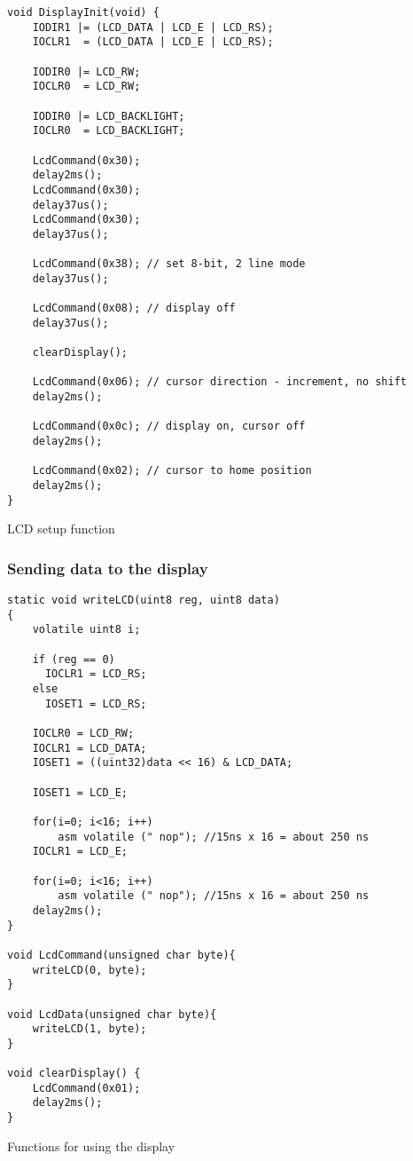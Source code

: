 \documentclass[10pt]{article}
\begin{document}
\begin{program}[h]
	\begin{lstlisting}
void DisplayInit(void) {
	IODIR1 |= (LCD_DATA | LCD_E | LCD_RS);
	IOCLR1  = (LCD_DATA | LCD_E | LCD_RS);

	IODIR0 |= LCD_RW;
	IOCLR0  = LCD_RW;
	
    IODIR0 |= LCD_BACKLIGHT;
    IOCLR0  = LCD_BACKLIGHT;

    LcdCommand(0x30);
    delay2ms();
    LcdCommand(0x30);
    delay37us();
    LcdCommand(0x30);
    delay37us();

    LcdCommand(0x38); // set 8-bit, 2 line mode
    delay37us();

    LcdCommand(0x08); // display off
    delay37us();

    clearDisplay();

    LcdCommand(0x06); // cursor direction - increment, no shift
    delay2ms();

    LcdCommand(0x0c); // display on, cursor off
    delay2ms();

    LcdCommand(0x02); // cursor to home position
    delay2ms();
}
	\end{lstlisting}
	\caption{LCD setup function}
\end{program}

\subsubsection{Sending data to the display}

\begin{program}[h]
	\begin{lstlisting}
static void writeLCD(uint8 reg, uint8 data)
{
	volatile uint8 i;

	if (reg == 0)
	  IOCLR1 = LCD_RS;
	else
	  IOSET1 = LCD_RS;

    IOCLR0 = LCD_RW;
	IOCLR1 = LCD_DATA;
	IOSET1 = ((uint32)data << 16) & LCD_DATA;
	
	IOSET1 = LCD_E;

	for(i=0; i<16; i++)
        asm volatile (" nop"); //15ns x 16 = about 250 ns
	IOCLR1 = LCD_E;

	for(i=0; i<16; i++)
        asm volatile (" nop"); //15ns x 16 = about 250 ns
    delay2ms();
}

void LcdCommand(unsigned char byte){
    writeLCD(0, byte);
}

void LcdData(unsigned char byte){
    writeLCD(1, byte);
}

void clearDisplay() {
    LcdCommand(0x01); 
    delay2ms();
}
	\end{lstlisting}
	\caption{Functions for using the display}
	\label{lst:display-util-functions}
\end{program}
\end{document}
